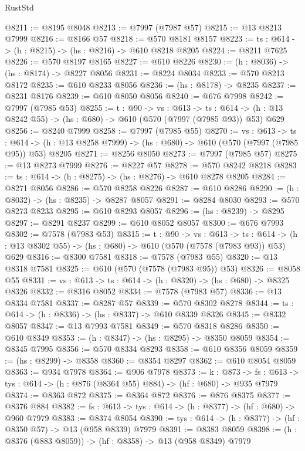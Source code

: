 \begin{lexlean}{RustStd}
\begin{coremodule}
@8211 := @8195 @8048
@8213 := @7997 (@7987 @57)
@8215 := @13 @8213 @7999
@8216 := @8166 @57
@8218 := @570 @8181 @8157
@8223 := {ts : @614} -> (h : @8215) -> (hs : @8216) -> @610 @8218 @8205
@8224 := @8211 @7625
@8226 := @570 @8197 @8165
@8227 := @610 @8226
@8230 := (h : @8036) -> (hs : @8174) -> @8227 @8056
@8231 := @8224 @8034
@8233 := @570 @8213 @8172
@8235 := @610 @8233 @8056
@8236 := (hs : @8178) -> @8235
@8237 := @8231 @8176
@8239 := @610 @8050 @8056
@8240 := @676 @7998
@8242 := @7997 (@7985 @53)
@8255 := {t : @90} ->
  {vs : @613} ->
  {ts : @614} -> (h : @13 @8242 @55) -> (hs : @680) -> @610 (@570 (@7997 (@7985 @93)) @53) @629
@8256 := @8240 @7999
@8258 := @7997 (@7985 @55)
@8270 := {vs : @613} ->
  {ts : @614} -> (h : @13 @8258 @7999) -> (hs : @680) -> @610 (@570 (@7997 (@7985 @95)) @53) @8205
@8271 := @8256 @8050
@8273 := @7997 (@7985 @57)
@8275 := @13 @8273 @7999
@8276 := @8227 @57
@8278 := @570 @8242 @8218
@8283 := {ts : @614} -> (h : @8275) -> (hs : @8276) -> @610 @8278 @8205
@8284 := @8271 @8056
@8286 := @570 @8258 @8226
@8287 := @610 @8286
@8290 := (h : @8032) -> (hs : @8235) -> @8287 @8057
@8291 := @8284 @8030
@8293 := @570 @8273 @8233
@8295 := @610 @8293 @8057
@8296 := (hs : @8239) -> @8295
@8297 := @8291 @8237
@8299 := @610 @8052 @8057
@8300 := @676 @7993
@8302 := @7578 (@7983 @53)
@8315 := {t : @90} ->
  {vs : @613} ->
  {ts : @614} -> (h : @13 @8302 @55) -> (hs : @680) -> @610 (@570 (@7578 (@7983 @93)) @53) @629
@8316 := @8300 @7581
@8318 := @7578 (@7983 @55)
@8320 := @13 @8318 @7581
@8325 := @610 (@570 (@7578 (@7983 @95)) @53)
@8326 := @8058 @55
@8331 := {vs : @613} -> {ts : @614} -> (h : @8320) -> (hs : @680) -> @8325 @8326
@8332 := @8316 @8052
@8334 := @7578 (@7983 @57)
@8336 := @13 @8334 @7581
@8337 := @8287 @57
@8339 := @570 @8302 @8278
@8344 := {ts : @614} -> (h : @8336) -> (hs : @8337) -> @610 @8339 @8326
@8345 := @8332 @8057
@8347 := @13 @7993 @7581
@8349 := @570 @8318 @8286
@8350 := @610 @8349
@8353 := (h : @8347) -> (hs : @8295) -> @8350 @8059
@8354 := @8345 @7995
@8356 := @570 @8334 @8293
@8358 := @610 @8356 @8059
@8359 := (hs : @8299) -> @8358
@8360 := @8354 @8297
@8362 := @610 @8054 @8059
@8363 := @934 @7978
@8364 := @906 @7978
@8373 := {k : @873} ->
  {fs : @613} -> {tys : @614} -> (h : @876 (@8364 @55) @884) -> (hf : @680) -> @935 @7979
@8374 := @8363 @872
@8375 := @8364 @872
@8376 := @876 @8375
@8377 := @8376 @884
@8382 := {fs : @613} -> {tys : @614} -> (h : @8377) -> (hf : @680) -> @960 @7979
@8383 := @8374 @8054
@8390 := {tys : @614} -> (h : @8377) -> (hf : @8350 @57) -> @13 (@958 @8339) @7979
@8391 := @8383 @8059
@8398 := (h : @8376 (@883 @8059)) -> (hf : @8358) -> @13 (@958 @8349) @7979

\end{coremodule}
\end{lexlean}
